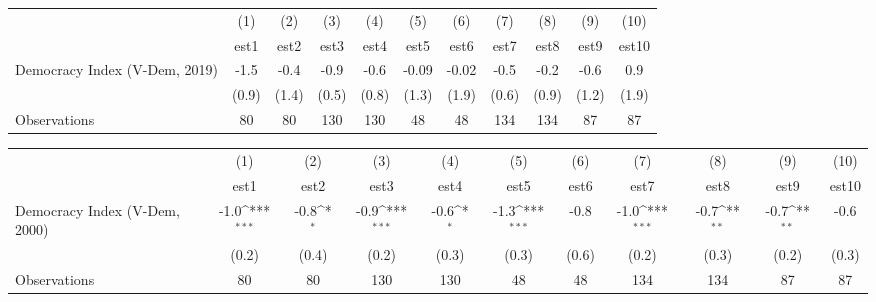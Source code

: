 {
\def\sym#1{\ifmmode^{#1}\else\(^{#1}\)\fi}
\begin{tabular}{l*{10}{c}}
                &\multicolumn{1}{c}{(1)}         &\multicolumn{1}{c}{(2)}         &\multicolumn{1}{c}{(3)}         &\multicolumn{1}{c}{(4)}         &\multicolumn{1}{c}{(5)}         &\multicolumn{1}{c}{(6)}         &\multicolumn{1}{c}{(7)}         &\multicolumn{1}{c}{(8)}         &\multicolumn{1}{c}{(9)}         &\multicolumn{1}{c}{(10)}         \\
                &     est1         &     est2         &     est3         &     est4         &     est5         &     est6         &     est7         &     est8         &     est9         &    est10         \\
Democracy Index (V-Dem, 2019)&     -1.5         &     -0.4         &     -0.9         &     -0.6         &    -0.09         &    -0.02         &     -0.5         &     -0.2         &     -0.6         &      0.9         \\
                &    (0.9)         &    (1.4)         &    (0.5)         &    (0.8)         &    (1.3)         &    (1.9)         &    (0.6)         &    (0.9)         &    (1.2)         &    (1.9)         \\
Observations    &       80         &       80         &      130         &      130         &       48         &       48         &      134         &      134         &       87         &       87         \\
\end{tabular}
}
{
\def\sym#1{\ifmmode^{#1}\else\(^{#1}\)\fi}
\begin{tabular}{l*{10}{c}}
                &\multicolumn{1}{c}{(1)}         &\multicolumn{1}{c}{(2)}         &\multicolumn{1}{c}{(3)}         &\multicolumn{1}{c}{(4)}         &\multicolumn{1}{c}{(5)}         &\multicolumn{1}{c}{(6)}         &\multicolumn{1}{c}{(7)}         &\multicolumn{1}{c}{(8)}         &\multicolumn{1}{c}{(9)}         &\multicolumn{1}{c}{(10)}         \\
                &     est1         &     est2         &     est3         &     est4         &     est5         &     est6         &     est7         &     est8         &     est9         &    est10         \\
Democracy Index (V-Dem, 2000)&     -1.0\sym{***}&     -0.8\sym{*}  &     -0.9\sym{***}&     -0.6\sym{*}  &     -1.3\sym{***}&     -0.8         &     -1.0\sym{***}&     -0.7\sym{**} &     -0.7\sym{**} &     -0.6         \\
                &    (0.2)         &    (0.4)         &    (0.2)         &    (0.3)         &    (0.3)         &    (0.6)         &    (0.2)         &    (0.3)         &    (0.2)         &    (0.3)         \\
Observations    &       80         &       80         &      130         &      130         &       48         &       48         &      134         &      134         &       87         &       87         \\
\end{tabular}
}
